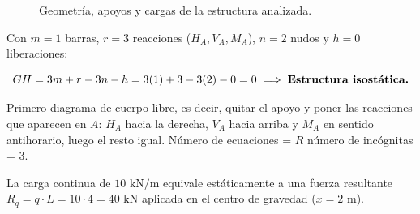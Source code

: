 \begin{figure}[H]
{%

    }

    \caption{Geometría, apoyos y cargas de la estructura analizada.}

\end{figure}



Con $m = 1$ barras, $r = 3$ reacciones ($H_A, V_A, M_A$), $n = 2$ nudos y $h = 0$ liberaciones:

\begin{equation}

    GH = 3m + r - 3n - h = 3(1) + 3 - 3(2) - 0 = 0 \implies \text{\textbf{Estructura isostática.}}

\end{equation}






Primero diagrama de cuerpo libre, es decir, quitar el apoyo y poner las reacciones que aparecen en $A$: $H_A$ hacia la derecha, $V_A$ hacia arriba y $M_A$ en sentido antihorario, luego el resto igual. Número de ecuaciones = $R$ número de incógnitas = 3.



La carga continua de $10\text{ kN/m}$ equivale estáticamente a una fuerza resultante $R_q = q \cdot L = 10 \cdot 4 = 40\text{ kN}$ aplicada en el centro de gravedad ($x = 2\text{ m}$).



